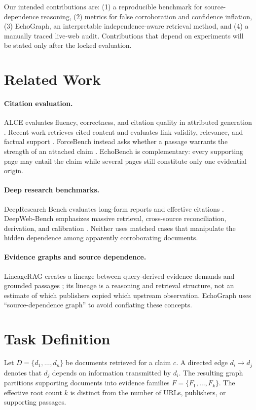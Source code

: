 \documentclass[11pt]{article}
\begin{document}
Our intended contributions are: (1) a reproducible benchmark for source-dependence reasoning,
(2) metrics for false corroboration and confidence inflation, (3) EchoGraph, an interpretable
independence-aware retrieval method, and (4) a manually traced live-web audit. Contributions that
depend on experiments will be stated only after the locked evaluation.

\section{Related Work}
\paragraph{Citation evaluation.}
ALCE evaluates fluency, correctness, and citation quality in attributed generation
\citep{gao2023alce}. Recent work retrieves cited content and evaluates link validity, relevance, and
factual support \citep{onweller2026cited}. ForceBench instead asks whether a passage warrants the
strength of an attached claim \citep{qian2026force}. EchoBench is complementary: every supporting
page may entail the claim while several pages still constitute only one evidential origin.

\paragraph{Deep research benchmarks.}
DeepResearch Bench evaluates long-form reports and effective citations \citep{du2025deepresearch}.
DeepWeb-Bench emphasizes massive retrieval, cross-source reconciliation, derivation, and calibration
\citep{xie2026deepweb}. Neither uses matched cases that manipulate the hidden dependence among
apparently corroborating documents.

\paragraph{Evidence graphs and source dependence.}
LineageRAG creates a lineage between query-derived evidence demands and grounded passages
\citep{zheng2026lineagerag}; its lineage is a reasoning and retrieval structure, not an estimate of
which publishers copied which upstream observation. EchoGraph uses ``source-dependence graph'' to
avoid conflating these concepts.

\section{Task Definition}
Let $D=\{d_1,\ldots,d_n\}$ be documents retrieved for a claim $c$. A directed edge
$d_i\rightarrow d_j$ denotes that $d_j$ depends on information transmitted by $d_i$. The resulting
graph partitions supporting documents into evidence families $F=\{F_1,\ldots,F_k\}$. The effective
root count $k$ is distinct from the number of URLs, publishers, or supporting passages.
\end{document}
